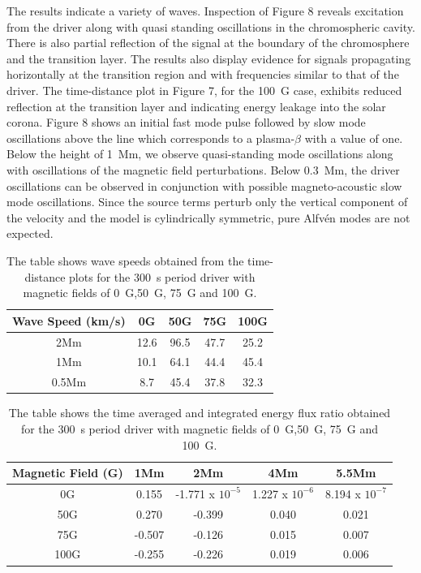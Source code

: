 \documentclass[physics,article,submit,pdftex,moreauthors]{Definitions/mdpi}
\begin{document}
The results indicate a variety of waves. Inspection of Figure 8 reveals excitation from the driver along with quasi standing oscillations in the chromospheric cavity. There is also partial reflection of the signal at the boundary of the chromosphere and the transition layer. The results also display evidence for signals propagating horizontally at the transition region and with frequencies similar to that of the driver. The time-distance plot in Figure 7, for the 100~G case, exhibits reduced reflection at the transition layer and indicating energy leakage into the solar corona. Figure 8 shows an initial fast mode pulse followed by slow mode oscillations above the line which corresponds to a plasma-$\beta$ with a value of one. Below the height of 1~Mm, we observe quasi-standing mode oscillations along with oscillations of the magnetic field perturbations. Below 0.3~Mm, the driver oscillations can be observed in conjunction with possible magneto-acoustic slow mode oscillations. Since the source terms perturb only the vertical component of the velocity and the model is cylindrically symmetric, pure Alfv\'en modes are not expected.



\begin{table}\label{wavespeeds}
\centering
\begin{tabular}{c c c c c}
\hline
Wave Speed (km/s)   &  0G  &  50G &  75G & 100G\\
\hline
2Mm & 12.6  &   96.5       &   47.7      &  25.2     \\
\hline
1Mm & 10.1  &    64.1      &   44.4     &   45.4      \\
\hline
0.5Mm & 8.7  &   45.4      &   37.8      &   32.3    \\
\hline

\end{tabular} 
\caption{The table shows wave speeds obtained from the  time-distance plots for the 300~s period driver with magnetic fields of 0~G,50~G, 75~G and 100~G.}
\label{Tablewavespeeds_300s}
\end{table}

\begin{table}\label{energyflux}
\centering
\begin{tabular}{c c c c c}
\hline
Magnetic Field (G)   &  1Mm  &  2Mm &  4Mm & 5.5Mm \\
\hline
0G & 0.155  &    -1.771 x $10^{-5}$      &   1.227 x $10^{-6}$     &   8.194 x $10^{-7}$      \\
\hline
50G & 0.270  &   -0.399       &   0.040      &  0.021     \\
\hline
75G & -0.507  &    -0.126      &   0.015     &   0.007      \\
\hline
100G & -0.255  &   -0.226      &   0.019      &   0.006    \\
\hline

\end{tabular} 
\caption{The table shows the time averaged and integrated energy flux ratio obtained  for the 300~s period driver with magnetic fields of 0~G,50~G, 75~G and 100~G.}
\label{energyfluxratio}
\end{table}
\end{document}

